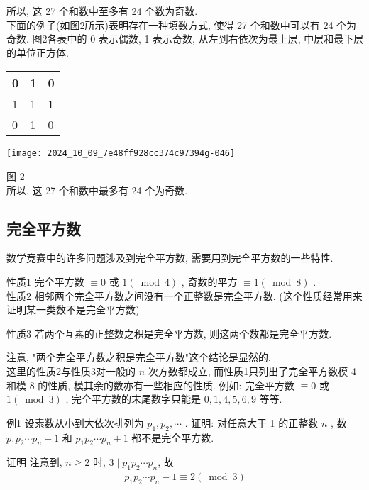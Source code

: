 	所以, 这 27 个和数中至多有 24 个数为奇数. \\
	下面的例子(如图2所示)表明存在一种填数方式, 使得 27 个和数中可以有 24 个为奇数. 图2各表中的 0 表示偶数,  1 表示奇数, 从左到右依次为最上层, 中层和最下层的单位正方体.

	\begin{center}
		\begin{tabular}{|l|l|l|}
			\hline
			0 & 1 & 0 \\
			\hline
			1 & 1 & 1 \\
			\hline
			0 & 1 & 0 \\
			\hline
		\end{tabular}
	\end{center}

	\begin{center}
		\texttt{[image: 2024\_10\_09\_7e48ff928cc374c97394g-046]}
	\end{center}

	图 2\\
	所以, 这 27 个和数中最多有 24 个为奇数.

	\subsection{完全平方数}
	数学竞赛中的许多问题涉及到完全平方数, 需要用到完全平方数的一些特性.

	性质1 完全平方数 $\equiv 0$ 或 $1(\bmod 4)$ , 奇数的平方 $\equiv 1(\bmod 8)$ . \\
	性质2 相邻两个完全平方数之间没有一个正整数是完全平方数. (这个性质经常用来证明某一类数不是完全平方数)

	性质3 若两个互素的正整数之积是完全平方数, 则这两个数都是完全平方数.

	注意, "两个完全平方数之积是完全平方数"这个结论是显然的.\\
	这里的性质2与性质3对一般的 $n$ 次方数都成立, 而性质1只列出了完全平方数模 4 和模 8 的性质, 模其余的数亦有一些相应的性质. 例如: 完全平方数 $\equiv 0$ 或 $1(\bmod 3)$ , 完全平方数的末尾数字只能是 $0,1,4,5,6,9$ 等等.

	例1 设素数从小到大依次排列为 $p_{1}, p_{2}, \cdots$ . 证明: 对任意大于 1 的正整数 $n$ , 数 $p_{1} p_{2} \cdots p_{n}-1$ 和 $p_{1} p_{2} \cdots p_{n}+1$ 都不是完全平方数.

	证明 注意到, $n \geqslant 2$ 时, $3 \mid p_{1} p_{2} \cdots p_{n}$, 故
	\begin{align*}
		p_{1} p_{2} \cdots p_{n}-1 \equiv 2(\bmod 3)
	\end{align*}

